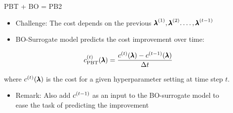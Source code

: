\documentclass[aspectratio=169]{../latex_main/tntbeamer}  %
\begin{document}
\begin{frame}[c]{PBT  + BO = PB2 }

\begin{itemize}
	\item \alert{Challenge}: The cost depends on the previous ${\pmb{\lambda}}^{(1)}, {\pmb{\lambda}}^{(2)}. \ldots, {\pmb{\lambda}}^{(t-1)}$
	\pause
	\medskip
	\item BO-Surrogate model predicts the cost improvement over time:
\end{itemize}

\begin{equation}
c_{\text{PBT}}^{(t)}(\pmb{\lambda})= \frac{c^{(t)}(\pmb{\lambda}) - c^{(t-1)}(\pmb{\lambda})}{\Delta t}\nonumber
\end{equation}

where $c^{(t)}(\pmb{\lambda})$ is the cost for a given hyperparameter setting at time step $t$.

\bigskip
\pause
\begin{itemize}
	\item Remark: Also add $c^{(t-1)}$ as an input to the BO-surrogate model to\\ ease the task of predicting the improvement
\end{itemize}

\end{frame}
\end{document}
